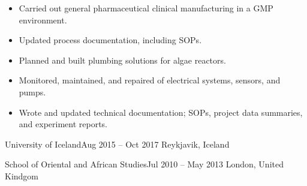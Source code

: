 \documentclass[10pt,a4paper]{altacv}
\begin{document}
\divider

\begin{itemize}
        \item Carried out general pharmaceutical clinical manufacturing in a GMP environment. 
        \item Updated process documentation, including SOPs.
\end{itemize}

\divider

\begin{itemize}
            \item Planned and built plumbing solutions for algae reactors. 
            \item Monitored, maintained, and repaired of electrical systems, sensors, and pumps. 
            \item Wrote and updated technical documentation; SOPs, project data summaries, and experiment reports.
\end{itemize}






 {University of Iceland}{Aug 2015 -- Oct 2017} {Reykjavik, Iceland}

\divider

 {School of Oriental and African Studies}{Jul 2010 -- May 2013} {London, United Kindgom}

\clearpage
\end{document}
